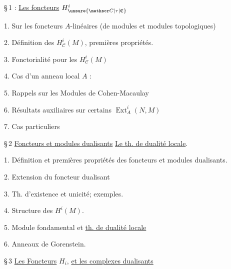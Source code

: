 \S\,1 : \uline{Les foncteurs} $H^i_{\unsure{\mathscr C|\tau|\mathfrak C}}$

\noindent{}%
1. Sur les foncteurs $A$-linéaires (de modules et modules topologiques)

2. Définition des $H^i_{\mathscr C}(M)$, premières propriétés.

3. Fonctorialité pour les $H^i_{\mathscr C}(M)$ 

4. Cas d'un anneau local $A$ : 

5.  Rappels sur les Modules de Cohen-Macaulay

6. Résultats auxiliaires sur certains $\operatorname{Ext}_A^i(N,M)$ \margin{[$M$ \unsure{Ch. Mac|Coh. Mac.} de supp. $\operatorname{Spec}(A)$}

7. Cas particuliers

\S\,2 \uline{Foncteurs et modules dualisants}  \uline{Le th. de dualité locale}.

1. Définition et premières propriétés des foncteurs et modules dualisants.

2. Extension du foncteur dualisant

3. Th. d'existence et unicité; exemples.

4.  Structure des $H^i(M)$.

5. Module fondamental et \uline{th. de dualité locale}

6. Anneaux de Gorenstein.


\S\,3 \uline{Les Foncteurs} $H_i$, \uline{et les complexes dualisants}

